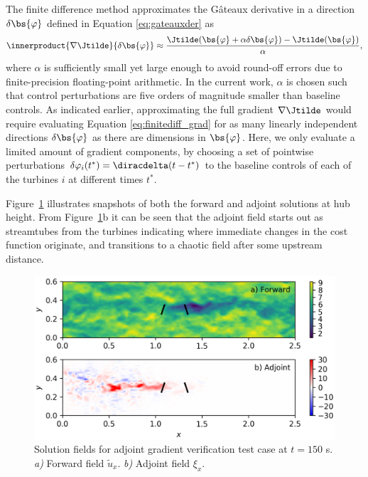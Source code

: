 	The finite difference method approximates the G\^ateaux derivative in a direction $\delta \bs{\varphi}$ defined in Equation \eqref{eq:gateauxder} as
	\begin{equation}\label{eq:finitediff_grad}
		\innerproduct{\nabla \Jtilde}{\delta \bs{\varphi}} \approx \frac{\Jtilde(\bs{\varphi} + \alpha \delta \bs{\varphi}) - \Jtilde(\bs{\varphi})}{\alpha},
	\end{equation}
	where $\alpha$ is sufficiently small yet large enough to avoid round-off errors due to finite-precision floating-point arithmetic. In the current work, $\alpha$ is chosen such that control perturbations are five  orders of magnitude smaller than baseline controls. As indicated earlier, approximating the full gradient $\nabla \Jtilde$ would require evaluating Equation \eqref{eq:finitediff_grad} for as many linearly independent directions $\delta \bs{\varphi}$ as there are dimensions in $\bs{\varphi}$. Here, we only evaluate a limited amount of gradient components, by choosing a set of pointwise perturbations $\delta \varphi_i(t^*) =\diracdelta(t-t^*)$ to the baseline controls of each of the turbines $i$ at different times $t^*$. 
	
	Figure~\ref{fig:forwardfield_adjointfield} illustrates snapshots of both the forward and adjoint solutions at hub height. From Figure~\ref{fig:forwardfield_adjointfield}b it can be seen that the adjoint field starts out as streamtubes from the turbines indicating where immediate changes in the cost function originate, and transitions to a chaotic field after some upstream distance. 
	
	\begin{figure}
		\includegraphics[width=\textwidth]{chapters/optimal_control_problem/forward_v_adjoint.eps}
	\caption[Solution fields for adjoint gradient verification test case at $t=150$ s.]{Solution fields for adjoint gradient verification test case at $t=150$ s. \emph{a)} Forward field $\tilde{u}_x$. \emph{b)} Adjoint field $\xi_x$. \label{fig:forwardfield_adjointfield}}
	\end{figure}

